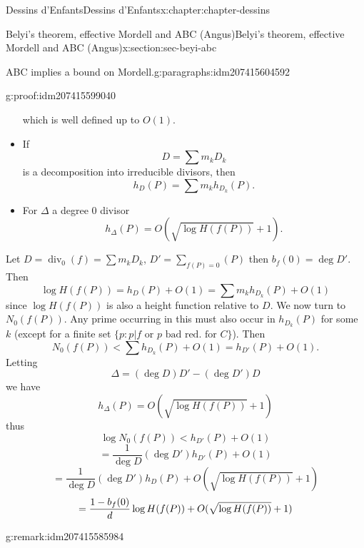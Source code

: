 \documentclass[oneside,10pt,]{book}
\newcommand{\qedhere}{\relax}
\numberwithin{equation}{section}
\DeclareMathOperator{\divisor}{div}
\newcommand{\lt}{<}
\begin{document}
\begin{chapterptx}{Dessins d'Enfants}{}{Dessins d'Enfants}{}{}{x:chapter:chapter-dessins}
\begin{sectionptx}{Belyi's theorem, effective Mordell and ABC (Angus)}{}{Belyi's theorem, effective Mordell and ABC (Angus)}{}{}{x:section:sec-beyi-abc}
\begin{paragraphs}{ABC implies a bound on Mordell.}{g:paragraphs:idm207415604592}
\begin{proofptx}{}{g:proof:idm207415599040}
\begin{itemize}[label=\textbullet]
which is well defined up to  \(O(1)\).%
\item{}If%
\begin{equation*}
D=  \sum m_k D_k
\end{equation*}
is a decomposition into irreducible divisors, then%
\begin{equation*}
h_D(P) = \sum m_k h_{D_k}(P)\text{.}
\end{equation*}
%
\item{}For \(\Delta\) a degree 0 divisor%
\begin{equation*}
h_{\Delta} (P) = O(\sqrt{\log H(f(P))} + 1)\text{.}
\end{equation*}
%
\end{itemize}
%
\par
Let \(D = \divisor_0(f) = \sum m_k D_k\), \(D' = \sum_{f(P) = 0} (P)\) then \(b_f(0) = \deg D'\). Then%
\begin{equation*}
\log H(f(P)) = h_D(P) + O(1) = \sum m_k h_{D_k}(P) + O(1)
\end{equation*}
since \(\log H(f(P))\) is also a height function relative to \(D\). We now turn to \(N_0(f(P))\). Any prime occurring in this must also occur in \(h_{D_k}(P)\) for some \(k\) (except for a finite set \(\{p : p|f \text{ or } p \text{ bad red. for } C\}\)). Then%
\begin{equation*}
N_0(f(P))  \lt \sum h_{D_k}(P) + O(1) = h_{D'}(P) + O(1)\text{.}
\end{equation*}
Letting%
\begin{equation*}
\Delta = (\deg D) D' - (\deg D') D
\end{equation*}
we have%
\begin{equation*}
h_{\Delta} (P) = O(\sqrt{\log H(f(P))} + 1)
\end{equation*}
thus%
\begin{equation*}
\log N_0(f(P)) \lt h_{D'} (P) + O(1)
\end{equation*}
%
\begin{equation*}
= \frac{1}{\deg D} (\deg D') h_{D'} (P) + O(1)
\end{equation*}
%
\begin{equation*}
= \frac{1}{\deg D} (\deg D') h_{D} (P) + O(\sqrt{\log H(f(P))} + 1)
\end{equation*}
%
\begin{equation*}
= \frac{1- b_f(0)}{d} \log  H(f(P)) + O(\sqrt{\log H(f(P))} + 1)\qedhere
\end{equation*}
%
\end{proofptx}
\begin{remark}{}{g:remark:idm207415585984}%

\end{remark}
\end{paragraphs}
\end{sectionptx}
\end{chapterptx}
\end{document}
